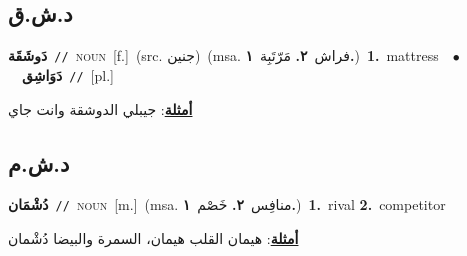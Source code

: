 \documentclass[10pt,a4paper,twoside]{article} %
\begin{document}
\begin{multicols}{2}
\vspace{-3mm}
\subsection*{\color{blue}\foreignlanguage{arabic}{د.ش.ق}\color{blue}{}} 

{\setlength\topsep{0pt}\textbf{\foreignlanguage{arabic}{دَوشَقَة}}\ {\color{gray}\texttt{//}\color{black}}\ \textsc{noun}\ [f.]\ (src. \color{gray}\foreignlanguage{arabic}{جنين}\color{black})\ \color{gray}(msa. \foreignlanguage{arabic}{فراش}~\foreignlanguage{arabic}{\textbf{٢.}}  \foreignlanguage{arabic}{مَرّتَبِة}~\foreignlanguage{arabic}{\textbf{١.}})\color{black}\ \textbf{1.}~mattress\ \ $\bullet$\ \ \setlength\topsep{0pt}\textbf{\foreignlanguage{arabic}{دَوَاشِق}}\ {\color{gray}\texttt{//}\color{black}}\ [pl.]\  \begin{flushright}\color{gray}\foreignlanguage{arabic}{\textbf{\underline{\foreignlanguage{arabic}{أمثلة}}}: جيبلي الدوشقة وانت جاي}\end{flushright}\color{black}} \vspace{2mm}

\vspace{-3mm}
\subsection*{\color{blue}\foreignlanguage{arabic}{د.ش.م}\color{blue}{}} 

{\setlength\topsep{0pt}\textbf{\foreignlanguage{arabic}{دُشْمَان}}\ {\color{gray}\texttt{//}\color{black}}\ \textsc{noun}\ [m.]\ \color{gray}(msa. \foreignlanguage{arabic}{منافِس}~\foreignlanguage{arabic}{\textbf{٢.}}  \foreignlanguage{arabic}{خَصْم}~\foreignlanguage{arabic}{\textbf{١.}})\color{black}\ \textbf{1.}~rival  \textbf{2.}~competitor\  \begin{flushright}\color{gray}\foreignlanguage{arabic}{\textbf{\underline{\foreignlanguage{arabic}{أمثلة}}}: هيمان القلب هيمان، السمرة والبيضا دُشْمان}\end{flushright}\color{black}} \vspace{2mm}


\end{multicols}
\end{document}

